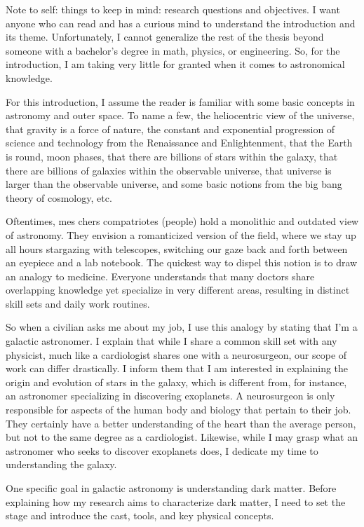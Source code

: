 Note to self: things to keep in mind: research questions and objectives. I want anyone who can read and has a curious mind to understand the introduction and its theme. Unfortunately, I cannot generalize the rest of the thesis beyond someone with a bachelor's degree in math, physics, or engineering. So, for the introduction, I am taking very little for granted when it comes to astronomical knowledge. 

For this introduction, I assume the reader is familiar with some basic concepts in astronomy and outer space. To name a few, the heliocentric view of the universe, that gravity is a force of nature, the constant and exponential progression of science and technology from the Renaissance and Enlightenment, that the Earth is round, moon phases, that there are billions of stars within the galaxy, that there are billions of galaxies within the observable universe, that universe is larger than the observable universe, and some basic notions from the big bang theory of cosmology, etc. 

Oftentimes, mes chers compatriotes (people) hold a monolithic and outdated view of astronomy. They envision a romanticized version of the field, where we stay up all hours stargazing with telescopes, switching our gaze back and forth between an eyepiece and a lab notebook. The quickest way to dispel this notion is to draw an analogy to medicine. Everyone understands that many doctors share overlapping knowledge yet specialize in very different areas, resulting in distinct skill sets and daily work routines. 

So when a civilian asks me about my job, I use this analogy by stating that I'm a galactic astronomer. I explain that while I share a common skill set with any physicist, much like a cardiologist shares one with a neurosurgeon, our scope of work can differ drastically.  I inform them that I am interested in explaining the origin and evolution of stars in the galaxy, which is different from, for instance, an astronomer specializing in discovering exoplanets. A neurosurgeon is only responsible for aspects of the human body and biology that pertain to their job. They certainly have a better understanding of the heart than the average person, but not to the same degree as a cardiologist. Likewise, while I may grasp what an astronomer who seeks to discover exoplanets does, I dedicate my time to understanding the galaxy. 

One specific goal in galactic astronomy is understanding dark matter. Before explaining how my research aims to characterize dark matter, I need to set the stage and introduce the cast, tools, and key physical concepts. 


